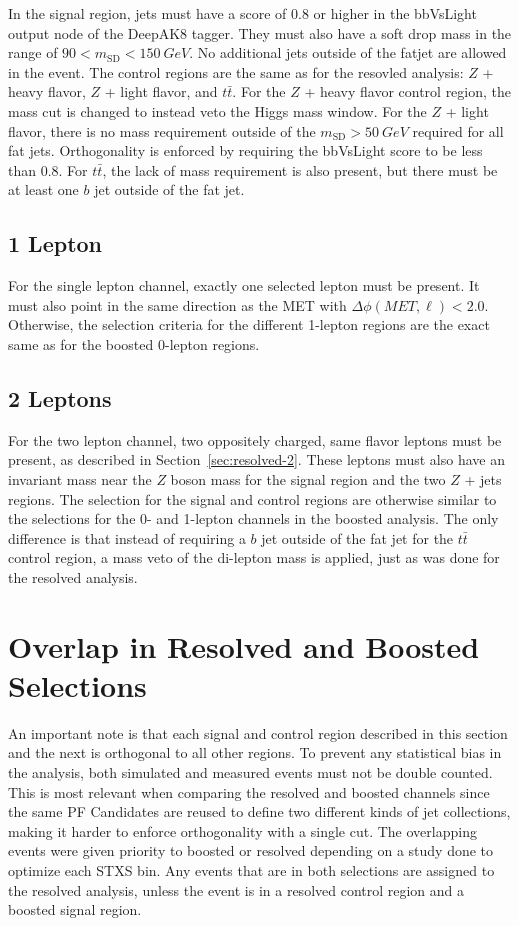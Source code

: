 In the signal region, jets must have a score of 0.8 or higher in the
bbVsLight output node of the DeepAK8 tagger.
They must also have a soft drop mass in the range of $90 < m_\mathrm{SD} < \SI{150}{GeV}$.
No additional jets outside of the fatjet are allowed in the event.
The control regions are the same as for the resovled analysis:
$Z$ + heavy flavor, $Z$ + light flavor, and $t\bar{t}$.
For the $Z$ + heavy flavor control region,
the mass cut is changed to instead veto the Higgs mass window.
For the $Z$ + light flavor, there is no mass requirement outside of the
$m_\textrm{SD} > \SI{50}{GeV}$ required for all fat jets.
Orthogonality is enforced by requiring the bbVsLight score to be less than 0.8.
For $t\bar{t}$, the lack of mass requirement is also present,
but there must be at least one $b$ jet outside of the fat jet.

\subsection{1 Lepton}

For the single lepton channel, exactly one selected lepton must be present.
It must also point in the same direction as the MET with $\Delta \phi(MET, \ell) < 2.0$.
Otherwise, the selection criteria for the different 1-lepton regions
are the exact same as for the boosted 0-lepton regions.

\subsection{2 Leptons}

For the two lepton channel, two oppositely charged, same flavor leptons must be present,
as described in Section~\ref{sec:resolved-2}.
These leptons must also have an invariant mass near the $Z$ boson mass for the signal region
and the two $Z$ + jets regions.
The selection for the signal and control regions are otherwise similar to the selections
for the 0- and 1-lepton channels in the boosted analysis.
The only difference is that instead of requiring a $b$ jet outside of the fat jet
for the $t\bar{t}$ control region,
a mass veto of the di-lepton mass is applied, just as was done for the resolved analysis.

\section{Overlap in Resolved and Boosted Selections}

An important note is that each signal and control region described in this section and the next
is orthogonal to all other regions.
To prevent any statistical bias in the analysis,
both simulated and measured events must not be double counted.
This is most relevant when comparing the resolved and boosted channels since
the same PF Candidates are reused to define two different kinds of jet collections,
making it harder to enforce orthogonality with a single cut.
The overlapping events were given priority to boosted or resolved depending on
a study done to optimize each STXS bin.
Any events that are in both selections are assigned to the resolved analysis,
unless the event is in a resolved control region and a boosted signal region.
